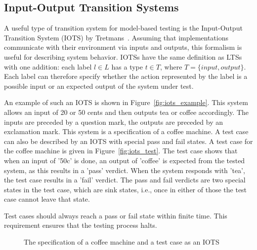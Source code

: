 \subsection{Input-Output Transition Systems}
A useful type of transition system for model-based testing is the Input-Output Transition System (IOTS) by Tretmans~\cite{Tretmans:testgeneration}. Assuming that implementations communicate with their environment via inputs and outputs, this formalism is useful for describing system behavior. IOTSs have the same definition as LTSs with one addition: each label $l \in L$ has a type $t \in T$, where $T = \{input, output\}$. Each label can therefore specify whether the action represented by the label is a possible input or an expected output of the system under test.

An example of such an IOTS is shown in Figure~\ref{fig:iots_example}. This system allows an input of 20 or 50 cents and then outputs tea or coffee accordingly. The inputs are preceded by a question mark, the outputs are preceded by an exclamation mark. This system is a specification of a coffee machine. A test case can also be described by an IOTS with special pass and fail states. A test case for the coffee machine is given in Figure~\ref{fig:iots_test}. The test case shows that when an input of '50c' is done, an output of 'coffee' is expected from the tested system, as this results in a 'pass' verdict. When the system responds with 'tea', the test case results in a 'fail' verdict. The pass and fail verdicts are two special states in the test case, which are sink states, i.e., once in either of those the test case cannot leave that state. 

Test cases should always reach a pass or fail state within finite time. This requirement ensures that the testing process halts.
\begin{figure}[h]
  \begin{center}
    \subfloat[An IOTS]{\label{fig:iots_example}}
  \end{center}
  \caption{The specification of a coffee machine and a test case as an IOTS}
\end{figure}


